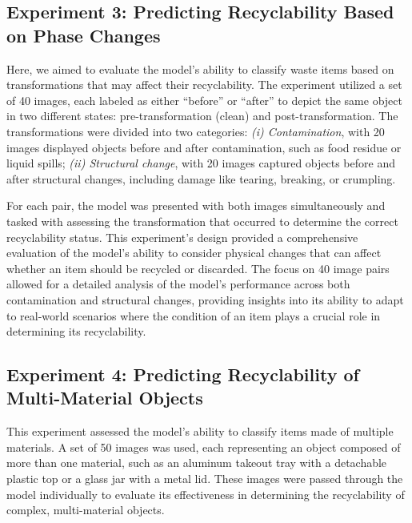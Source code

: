 \documentclass{article}
\begin{document}
\subsection{Experiment 3: Predicting Recyclability Based on Phase Changes}
Here, we aimed to evaluate the model’s ability to classify waste items based on transformations that may affect their recyclability. The experiment utilized a set of 40 images, each labeled as either “before” or “after” to depict the same object in two different states: pre-transformation (clean) and post-transformation. The transformations were divided into two categories: \textit{(i) Contamination}, with 20 images displayed objects before and after contamination, such as food residue or liquid spills; \textit{(ii) Structural change}, with 20 images captured objects before and after structural changes, including damage like tearing, breaking, or crumpling.


For each pair, the model was presented with both images simultaneously and tasked with assessing the transformation that occurred to determine the correct recyclability status. This experiment’s design provided a comprehensive evaluation of the model’s ability to consider physical changes that can affect whether an item should be recycled or discarded. The focus on 40 image pairs allowed for a detailed analysis of the model’s performance across both contamination and structural changes, providing insights into its ability to adapt to real-world scenarios where the condition of an item plays a crucial role in determining its recyclability.

\subsection{Experiment 4: Predicting Recyclability of Multi-Material Objects}

This experiment assessed the model’s ability to classify items made of multiple materials. A set of 50 images was used, each representing an object composed of more than one material, such as an aluminum takeout tray with a detachable plastic top or a glass jar with a metal lid. These images were passed through the model individually to evaluate its effectiveness in determining the recyclability of complex, multi-material objects.
\end{document}
